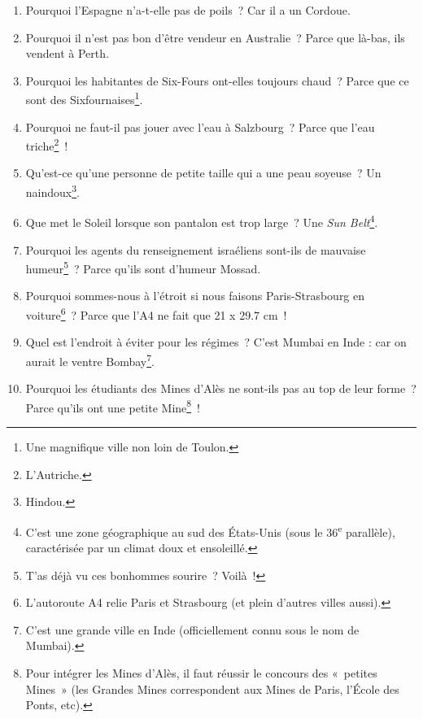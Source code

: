 \documentclass[10pt,a5paper,fullpage]{book}
\begin{document}
	\newpage
	\begin{enumerate}
		\item Pourquoi l’Espagne n’a-t-elle pas de poils~? Car il a un Cordoue.
		\item Pourquoi il n'est pas bon d'être vendeur en Australie~? Parce que là-bas, ils vendent à Perth. 
		\item Pourquoi les habitantes de Six-Fours ont-elles toujours chaud~? Parce que ce sont des Sixfournaises\footnote{Une magnifique ville non loin de Toulon.}. %
		\item Pourquoi ne faut-il pas jouer avec l’eau à Salzbourg~? Parce que l’eau triche\footnote{L'Autriche.}~!
		\item Qu’est-ce qu’une personne de petite taille qui a une peau soyeuse~? Un naindoux\footnote{Hindou.}.
		\item Que met le Soleil lorsque son pantalon est trop large~? Une \textit{Sun Belt}\footnote{C'est une zone géographique au sud des États-Unis (sous le 36\textsuperscript{e} parallèle), caractérisée par un climat doux et ensoleillé.}.
		\item Pourquoi les agents du renseignement israéliens sont-ils de mauvaise humeur\footnote{T'as déjà vu ces bonhommes sourire~? Voilà~!}~? Parce qu’ils sont d’humeur Mossad.
		\item Pourquoi sommes-nous à l'étroit si nous faisons Paris-Strasbourg en voiture\footnote{L’autoroute A4 relie Paris et Strasbourg (et plein d’autres villes aussi).}~? Parce que l'A4 ne fait que 21 x 29.7 cm~!
		\item Quel est l'endroit à éviter pour les régimes~? C'est Mumbai en Inde : car on aurait le ventre Bombay\footnote{C’est une grande ville en Inde (officiellement connu sous le nom de Mumbai).}. 
		\item Pourquoi les étudiants des Mines d’Alès ne sont-ils pas au top de leur forme~? Parce qu’ils ont une petite Mine\footnote{Pour intégrer les Mines d’Alès, il faut réussir le concours des « petites Mines » (les Grandes Mines correspondent aux Mines de Paris, l’École des Ponts, etc).}~!

\end{enumerate}
\end{document}

